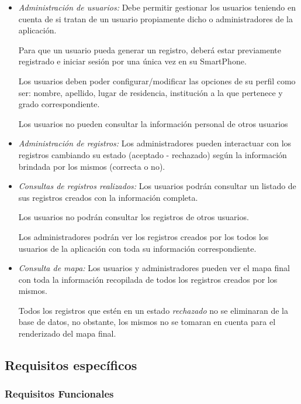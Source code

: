   \begin{itemize}
  
  \item \emph{Administración de usuarios:} Debe permitir gestionar los usuarios teniendo en cuenta de si tratan de un usuario propiamente dicho o administradores de la aplicación.
    
    Para que un usuario pueda generar un registro, deberá estar previamente registrado e iniciar sesión por una única vez en su SmartPhone.
    
    Los usuarios deben poder configurar/modificar las opciones de su perfil como ser: nombre, apellido, lugar de residencia, institución a la que pertenece y grado correspondiente.

    Los usuarios no pueden consultar la información personal de otros usuarios
  
  \item \emph{Administración de registros:} Los administradores pueden interactuar con los registros cambiando su estado (aceptado - rechazado) según la información brindada por los mismos (correcta o no).
  
  \item \emph{Consultas de registros realizados:} Los usuarios podrán consultar un listado de sus registros creados con la información completa.
  
  Los usuarios no podrán consultar los registros de otros usuarios.

  Los administradores podrán ver los registros creados por los todos los usuarios de la aplicación con toda su información correspondiente.

  \item \emph{Consulta de mapa:} Los usuarios y administradores pueden ver el mapa final con toda la información recopilada de todos los registros creados por los mismos.

  Todos los registros que estén en un estado \emph{rechazado} no se eliminaran de la base de datos, no obstante, los mismos no se tomaran en cuenta para el renderizado del mapa final. 
  
  \end{itemize}

 \subsection{Requisitos específicos}
        \subsubsection{Requisitos Funcionales}
        

